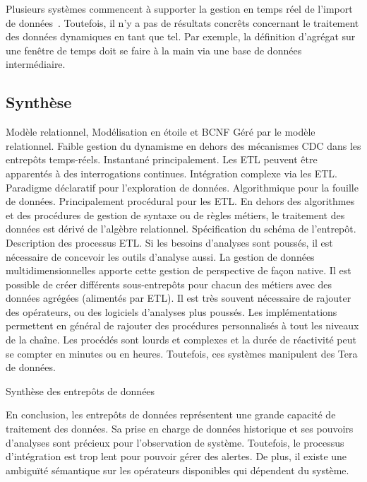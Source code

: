 Plusieurs systèmes commencent à supporter la gestion en temps réel de l'import de données~\cite{Thomsen:rite, Oracle:ODI}. Toutefois, il n'y a pas de résultats concrêts concernant le traitement des données dynamiques en tant que tel. Par exemple, la définition d'agrégat sur une fenêtre de temps doit se faire à la main via une base de données intermédiaire.

\subsection{Synthèse}
\begin{table}[!ht]
\criteretabDonnee
    {Modèle relationnel, Modélisation en étoile et BCNF}
    {Géré par le modèle relationnel.}
    {Faible gestion du dynamisme en dehors des mécanismes CDC dans les entrepôts temps-réels.}
\criteretabTraitement
    {Instantané principalement. Les ETL peuvent être apparentés à des interrogations continues.}
    {Intégration complexe via les ETL.}
    {Paradigme déclaratif pour l'exploration de données. Algorithmique pour la fouille de données. Principalement procédural pour les ETL.}
    {En dehors des algorithmes et des procédures de gestion de syntaxe ou de règles métiers, le traitement des données est dérivé de l'algèbre relationnel.}
\criteretabAdaptabilite
    {Spécification du schéma de l'entrepôt. Description des processus ETL. Si les besoins d'analyses sont poussés, il est nécessaire de concevoir les outils d'analyse aussi.}
    {La gestion de données multidimensionnelles apporte cette gestion de perspective de façon native. Il est possible de créer différents sous-entrepôts pour chacun des métiers avec des données agrégées (alimentés par ETL).}
    {Il est très souvent nécessaire de rajouter des opérateurs, ou des logiciels d'analyses plus poussés. Les implémentations permettent en général de rajouter des procédures personnalisés à tout les niveaux de la chaîne.}
    {Les procédés sont lourds et complexes et la durée de réactivité peut se compter en minutes ou en heures. Toutefois, ces systèmes manipulent des Tera de données.}
\caption{Synthèse des entrepôts de données}\label{tab:rw:supervision:warehouses:synthese}
\end{table}
En conclusion, les entrepôts de données représentent une grande capacité de traitement des données. Sa prise en charge de données historique et ses pouvoirs d'analyses sont précieux pour l'observation de système. Toutefois, le processus d'intégration est trop lent pour pouvoir gérer des alertes. De plus, il existe une ambiguïté sémantique sur les opérateurs disponibles qui dépendent du système.
